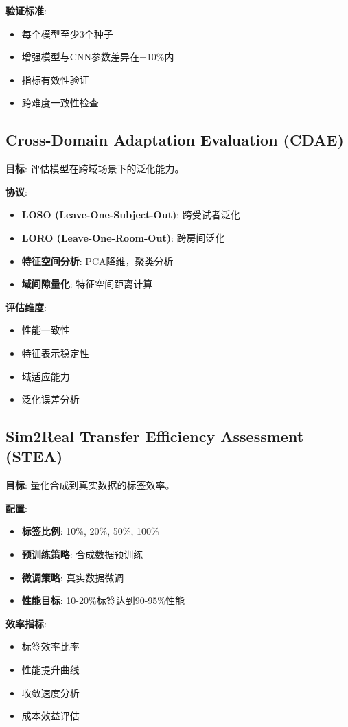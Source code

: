 \textbf{验证标准}:
\begin{itemize}
    \item 每个模型至少3个种子
    \item 增强模型与CNN参数差异在±10\%内
    \item 指标有效性验证
    \item 跨难度一致性检查
\end{itemize}

\subsection{Cross-Domain Adaptation Evaluation (CDAE)}
\textbf{目标}: 评估模型在跨域场景下的泛化能力。

\textbf{协议}:
\begin{itemize}
    \item \textbf{LOSO (Leave-One-Subject-Out)}: 跨受试者泛化
    \item \textbf{LORO (Leave-One-Room-Out)}: 跨房间泛化
    \item \textbf{特征空间分析}: PCA降维，聚类分析
    \item \textbf{域间隙量化}: 特征空间距离计算
\end{itemize}

\textbf{评估维度}:
\begin{itemize}
    \item 性能一致性
    \item 特征表示稳定性
    \item 域适应能力
    \item 泛化误差分析
\end{itemize}

\subsection{Sim2Real Transfer Efficiency Assessment (STEA)}
\textbf{目标}: 量化合成到真实数据的标签效率。

\textbf{配置}:
\begin{itemize}
    \item \textbf{标签比例}: 10\%, 20\%, 50\%, 100\%
    \item \textbf{预训练策略}: 合成数据预训练
    \item \textbf{微调策略}: 真实数据微调
    \item \textbf{性能目标}: 10-20\%标签达到90-95\%性能
\end{itemize}

\textbf{效率指标}:
\begin{itemize}
    \item 标签效率比率
    \item 性能提升曲线
    \item 收敛速度分析
    \item 成本效益评估
\end{itemize}

